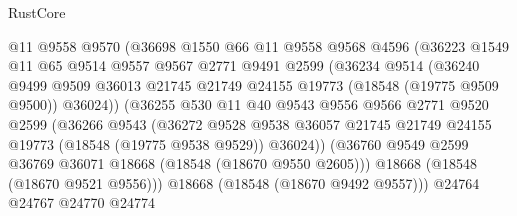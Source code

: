 \begin{lexlean}{RustCore}
\begin{coremodule}
                        @11
                        @9558
                        @9570
                        (@36698
                          @1550
                          @66
                          @11
                          @9558
                          @9568
                          @4596
                          (@36223
                            @1549
                            @11
                            @65
                            @9514
                            @9557
                            @9567
                            @2771
                            @9491
                            @2599
                            (@36234
                              @9514
                              (@36240
                                @9499
                                @9509
                                @36013
                                @21745
                                @21749
                                @24155
                                @19773
                                (@18548 (@19775 @9509 @9500))
                                @36024))
                            (@36255
                              @530
                              @11
                              @40
                              @9543
                              @9556
                              @9566
                              @2771
                              @9520
                              @2599
                              (@36266
                                @9543
                                (@36272
                                  @9528
                                  @9538
                                  @36057
                                  @21745
                                  @21749
                                  @24155
                                  @19773
                                  (@18548 (@19775 @9538 @9529))
                                  @36024))
                              (@36760
                                @9549
                                @2599
                                @36769
                                @36071
                                @18668
                                (@18548 (@18670 @9550 @2605)))
                              @18668
                              (@18548 (@18670 @9521 @9556)))
                            @18668
                            (@18548 (@18670 @9492 @9557)))
                          @24764
                          @24767
                          @24770
                          @24774

\end{coremodule}
\end{lexlean}
